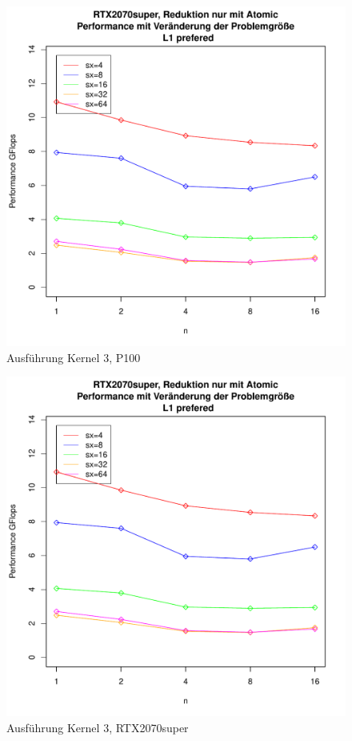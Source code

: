 \documentclass[10pt,a4paper]{article}
\begin{document}
	\begin{figure}
		\includegraphics[page=8,scale=0.8]{../Diagramme/onlyatomic_changei.pdf}
		
		\caption{Ausführung Kernel 3, P100 }
		\label{Ausführung Kernel3, P100 }
	\end{figure}
	
	\begin{figure}
		\includegraphics[page=2,scale=0.8]{../Diagramme/onlyatomic_changei.pdf}
		
		\caption{Ausführung Kernel 3, RTX2070super }
		\label{Ausführung Kernel3, RTX2070super }
	\end{figure}
	
\end{document}
